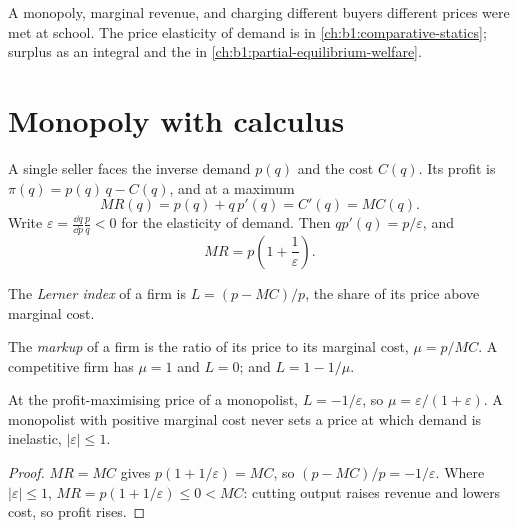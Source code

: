 \begin{recall}
A monopoly, marginal revenue,  and charging different buyers
different prices were met at school. The price elasticity of demand is in
\cref{ch:b1:comparative-statics}; surplus as an integral and the
 in \cref{ch:b1:partial-equilibrium-welfare}.
\end{recall}

\section{Monopoly with calculus}\label{sec:b1:monopoly-pricing:monopoly}

A single seller faces the inverse demand $p(q)$ and the cost $C(q)$. Its
profit is $\pi(q) = p(q)\,q - C(q)$, and at a maximum
\[
MR(q) = p(q) + q\,p'(q) = C'(q) = MC(q).
\]
Write $\varepsilon = \frac{\dd q}{\dd p}\frac pq < 0$ for the elasticity of demand. Then $qp'(q) = p/\varepsilon$, and
\[
MR = p\left(1 + \frac1\varepsilon\right).
\]

\begin{definition}\label{def:b1:monopoly-pricing:lerner}
The \emph{Lerner index} of a firm is $L = (p - MC)/p$, the share of its price
above marginal cost.
\end{definition}

\begin{definition}[Markup]\label{def:b1:monopoly-pricing:markup}
The \emph{markup} of a firm is the ratio of its price to its marginal cost,
$\mu = p/MC$. A competitive firm has $\mu = 1$ and $L = 0$; and $L = 1 - 1/\mu$.
\end{definition}

\begin{proposition}\label{prop:b1:monopoly-pricing:inverse-elasticity}
At the profit-maximising price of a monopolist, $L = -1/\varepsilon$, so
$\mu = \varepsilon/(1 + \varepsilon)$. A monopolist with positive marginal cost never sets a price at
which demand is inelastic, $|\varepsilon| \le 1$.
\end{proposition}

\begin{proof}
$MR = MC$ gives $p(1 + 1/\varepsilon) = MC$, so $(p - MC)/p = -1/\varepsilon$. Where
$|\varepsilon| \le 1$, $MR = p(1 + 1/\varepsilon) \le 0 < MC$: cutting output raises revenue and lowers
cost, so profit rises.
\end{proof}


